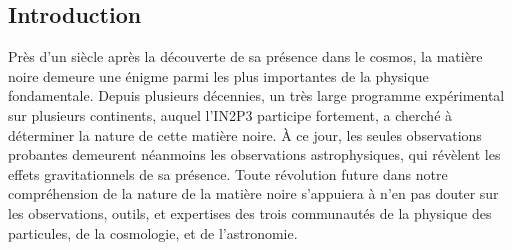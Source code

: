 \documentclass[12pt]{article}
\begin{document}


\subsection*{Introduction}

Près d'un siècle après la découverte de sa présence dans le cosmos, la matière noire demeure une énigme parmi les plus importantes de la physique fondamentale. Depuis plusieurs décennies, un très large programme expérimental sur plusieurs continents, auquel l'IN2P3 participe fortement, a cherché à déterminer la nature de cette matière noire. \`A ce jour, les seules observations probantes demeurent néanmoins les observations astrophysiques, qui révèlent les effets gravitationnels de sa présence. Toute révolution future dans notre compréhension de la nature de la matière noire s'appuiera à n'en pas douter sur les observations, outils, et expertises des trois communautés de la physique des particules, de la cosmologie, et de l'astronomie.
\end{document}
